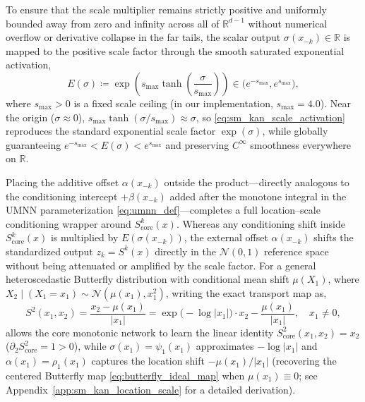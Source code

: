 \documentclass[11pt,a4paper]{article}
\theoremstyle{plain}
\theoremstyle{definition}
\theoremstyle{remark}
\begin{document}
To ensure that the scale multiplier remains strictly positive and uniformly bounded away from zero and infinity across all of $\mathbb{R}^{d-1}$ without numerical overflow or derivative collapse in the far tails, the scalar output $\sigma(x_{-k}) \in \mathbb{R}$ is mapped to the positive scale factor through the smooth saturated exponential activation,
\begin{equation}
    E(\sigma) \coloneqq \exp\left( s_{\max} \tanh\left( \frac{\sigma}{s_{\max}} \right) \right) \in \big(e^{-s_{\max}}, e^{s_{\max}}\big),
    \label{eq:sm_kan_scale_activation}
\end{equation}
where $s_{\max} > 0$ is a fixed scale ceiling (in our implementation, $s_{\max} = 4.0$). Near the origin ($\sigma \approx 0$), $s_{\max}\tanh(\sigma / s_{\max}) \approx \sigma$, so \eqref{eq:sm_kan_scale_activation} reproduces the standard exponential scale factor $\exp(\sigma)$, while globally guaranteeing $e^{-s_{\max}} < E(\sigma) < e^{s_{\max}}$ and preserving $C^\infty$ smoothness everywhere on $\mathbb{R}$.

Placing the additive offset $\alpha(x_{-k})$ outside the product---directly analogous to the conditioning intercept $+\beta(x_{-k})$ added after the monotone integral in the UMNN parameterization \eqref{eq:umnn_def}---completes a full location--scale conditioning wrapper around $S^k_{\text{core}}(x)$. Whereas any conditioning shift inside $S^k_{\text{core}}(x)$ is multiplied by $E(\sigma(x_{-k}))$, the external offset $\alpha(x_{-k})$ shifts the standardized output $z_k = S^k(x)$ directly in the $\mathcal{N}(0, 1)$ reference space without being attenuated or amplified by the scale factor. For a general heteroscedastic Butterfly distribution with conditional mean shift $\mu(X_1)$, where $X_2 \mid (X_1 = x_1) \sim \mathcal{N}(\mu(x_1), x_1^2)$, writing the exact transport map as,
\begin{equation}
    S^2(x_1, x_2) = \frac{x_2 - \mu(x_1)}{|x_1|} = \exp\big(-\log|x_1|\big) \cdot x_2 - \frac{\mu(x_1)}{|x_1|}, \quad x_1 \neq 0,
    \label{eq:butterfly_sm_decomp}
\end{equation}
allows the core monotonic network to learn the linear identity $S^2_{\text{core}}(x_1, x_2) = x_2$ ($\partial_2 S^2_{\text{core}} = 1 > 0$), while $\sigma(x_1) = \psi_1(x_1)$ approximates $-\log|x_1|$ and $\alpha(x_1) = \rho_1(x_1)$ captures the location shift $-\mu(x_1)/|x_1|$ (recovering the centered Butterfly map \eqref{eq:butterfly_ideal_map} when $\mu(x_1) \equiv 0$; see Appendix~\ref{app:sm_kan_location_scale} for a detailed derivation).
\end{document}
